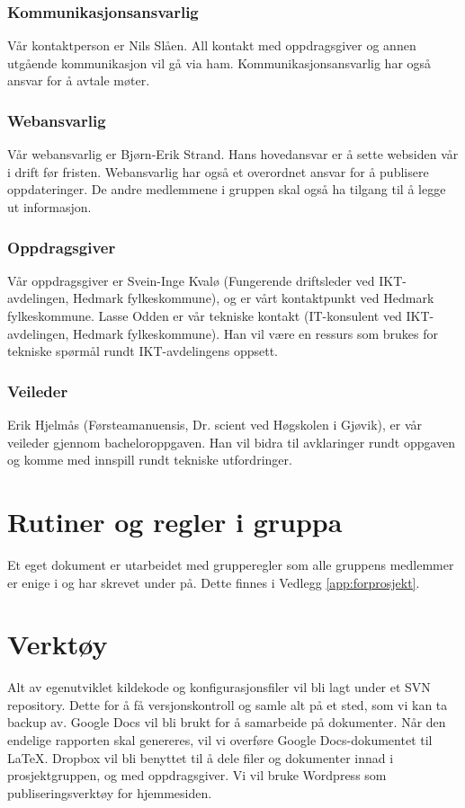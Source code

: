 \subsubsection{Kommunikasjonsansvarlig}
Vår kontaktperson er Nils Slåen. All kontakt med oppdragsgiver og annen utgående kommunikasjon vil gå via ham. Kommunikasjonsansvarlig har også ansvar for å avtale møter.

\subsubsection{Webansvarlig}
Vår webansvarlig er Bjørn-Erik Strand. Hans hovedansvar er å sette websiden vår i drift før fristen. Webansvarlig har også et overordnet ansvar for å publisere oppdateringer. De andre medlemmene i gruppen skal også ha tilgang til å legge ut informasjon.

\subsubsection{Oppdragsgiver}
Vår oppdragsgiver er Svein-Inge Kvalø (Fungerende driftsleder ved IKT-avdelingen, Hedmark fylkeskommune), og er vårt kontaktpunkt ved Hedmark fylkeskommune. Lasse Odden er vår tekniske kontakt (IT-konsulent ved IKT-avdelingen, Hedmark fylkeskommune). Han vil være en ressurs som brukes for tekniske spørmål rundt IKT-avdelingens oppsett.

\subsubsection{Veileder}
Erik Hjelmås (Førsteamanuensis, Dr. scient ved Høgskolen i Gjøvik), er vår veileder gjennom bacheloroppgaven. Han vil bidra til avklaringer rundt oppgaven og komme med innspill rundt tekniske utfordringer.

\section{Rutiner og regler i gruppa}
Et eget dokument er utarbeidet med grupperegler som alle gruppens medlemmer er enige i og har skrevet under på. Dette finnes i Vedlegg \ref{app:forprosjekt}.

\section{Verktøy}
Alt av egenutviklet kildekode og konfigurasjonsfiler vil bli lagt under et SVN repository. Dette for å få versjonskontroll og samle alt på et sted, som vi kan ta backup av. Google Docs vil bli brukt for å samarbeide på dokumenter. Når den endelige rapporten skal genereres, vil vi overføre Google Docs-dokumentet til \LaTeX. Dropbox vil bli benyttet til å dele filer og dokumenter innad i prosjektgruppen, og med oppdragsgiver. Vi vil bruke Wordpress som publiseringsverktøy for hjemmesiden.

